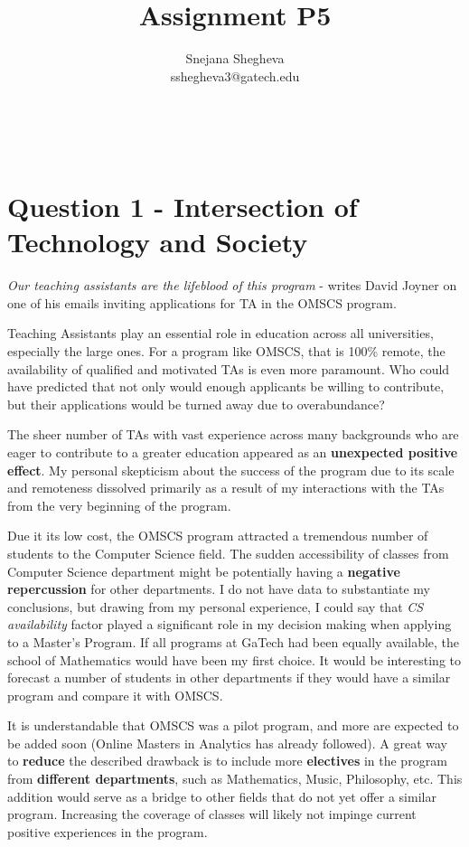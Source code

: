 \documentclass[12pt,letterpaper]{article}
\makeatletter
\renewcommand{\maketitle}{\bgroup
   \begin{center}
   \textbf{{\fontsize{18pt}{20}\selectfont \@title}}\\
   \vspace{10pt}
   {\fontsize{12pt}{0}\selectfont \@author} 
   \end{center}
}
\makeatother
\begin{document}
\title{Assignment P5}
\author{Snejana Shegheva \\ sshegheva3@gatech.edu}

\maketitle
\thispagestyle{fancy}

\section*{Question 1 - Intersection of Technology and Society}

\textit{Our teaching assistants are the lifeblood of this program} - writes David Joyner on one of his emails inviting applications for TA in the OMSCS program. 

Teaching Assistants play an essential role in education across all universities, especially the large ones. For a program like OMSCS, that is 100\% remote, the availability of qualified and motivated TAs is even more paramount. Who could have predicted that not only would enough applicants be willing to contribute, but their applications would be turned away due to overabundance?

The sheer number of TAs with vast experience across many backgrounds who are eager to contribute to a greater education appeared as an \textbf{unexpected positive effect}. My personal skepticism about the success of the program due to its scale and remoteness dissolved primarily as a result of my interactions with the TAs from the very beginning of the program. 

Due it its low cost, the OMSCS program attracted a tremendous number of students to the Computer Science field. The sudden accessibility of classes from Computer Science department might be potentially having a \textbf{negative repercussion} for other departments. I do not have data to substantiate my conclusions, but drawing from my personal experience, I could say that \textit{CS availability} factor played a significant role in my decision making when applying to a Master's Program. If all programs at GaTech had been equally available, the school of Mathematics would have been my first choice. It would be interesting to forecast a number of students in other departments if they would have a similar program and compare it with OMSCS.  

It is understandable that OMSCS was a pilot program, and more are expected to be added soon (Online Masters in Analytics has already followed). A great way to \textbf{reduce} the described drawback is to include more \textbf{electives} in the program from \textbf{different departments}, such as Mathematics, Music, Philosophy, etc. This addition would serve as a bridge to other fields that do not yet offer a similar program. Increasing the coverage of classes will likely not impinge current positive experiences in the program.
\end{document}
